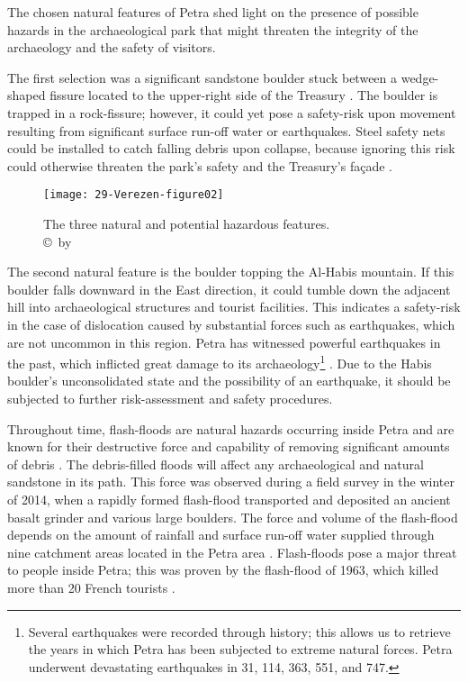 The  chosen natural features of Petra shed light on the presence of possible hazards in the archaeological park that might threaten the integrity of the archaeology and the safety of visitors.

The  first selection was a significant sandstone boulder stuck between a wedge-shaped fissure located to the upper-right side of the Treasury .
The boulder is trapped in a rock-fissure; however, it could yet pose a safety-risk upon movement resulting from
significant surface run-off water or earthquakes.
Steel safety nets could be installed to catch falling debris upon collapse, because ignoring this risk could otherwise threaten the park’s safety and the Treasury’s façade \parencite[2617--2639]{volkwein2011}.

\begin{figure}[!htb]
	\texttt{[image: 29-Verezen-figure02]}
	\caption{The three natural and potential hazardous features.
		{\normalfont\scriptsize \\ \copyright\ by \shortauthor
	}}
	\label{fig:29-Verezen-figure02}
\end{figure}

The  second natural feature is the boulder topping the Al-Habis mountain.
If this boulder falls downward in the East direction, it could tumble down the adjacent hill into archaeological structures and
tourist facilities.
This indicates a safety-risk in the case of dislocation caused by substantial forces such as earthquakes,
which are not uncommon in this region.
Petra has witnessed powerful earthquakes in the past, which inflicted great damage to its archaeology\footnote{Several earthquakes were recorded through history; this allows us to retrieve the years in which Petra has been subjected to extreme natural forces. Petra underwent devastating earthquakes in 31\BC, 114\AD, 363\AD, 551\AD, and 747\AD \parencites[63--64]{rababeh2014}[98--103]{peterman1994}.} \parencites[126]{alshawabkehy2010}[644]{heinrichs2008}.
Due to the Habis boulder’s unconsolidated state and the possibility of an earthquake,
it should be subjected to further risk-assessment and safety procedures. 

Throughout  time, flash-floods are natural hazards occurring inside Petra and are known for
their destructive force and capability of removing significant amounts of debris \parencites[78--84]{franchi2009}[104]{ortloff2005}.
The debris-filled floods will affect any archaeological and natural sandstone in its path.
This force was observed during a field survey in the winter of 2014, when a rapidly formed flash-flood transported and deposited an ancient basalt grinder  and various large boulders.
The force and volume of the flash-flood depends on the amount of rainfall and surface run-off water supplied through
nine catchment areas located in the Petra area \parencites[171--172]{alweshahr1999}[130]{nichols2009}.
Flash-floods pose a major threat to people inside Petra; this was proven by the flash-flood of 1963,
which killed more than \num{20} French tourists \parencites[55--57]{comer2012}[55]{lingis2002}.

